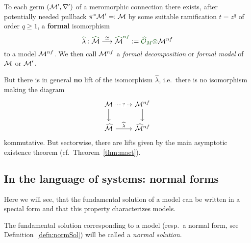 \begin{thm}\label{thm:leveltTurittin}
  To each germ $(\mathcal{M}',\nabla')$ of a meromorphic connection there exists, after
  potentially needed pullback $\pi^{*}\textcolor{black}{\mathcal{M}'}=:\mathcal{M}$ by some
  suitable ramification $t=z^q$ of order $q\geq1$, a
  \textcolor{green!30!black}{\textbf{formal}} isomorphism
  \[
    \textcolor{green!30!black}{\hat{\textcolor{black}{\lambda}}}:
    \textcolor{green!30!black}{\hat{\textcolor{black}{\cM}}}
    \overset{\cong}\longrightarrow
    \textcolor{green!30!black}{\hat{\textcolor{black}{\cM}}^{nf}}
    :=\textcolor{green!30!black}{\hat\cO_M\otimes}\cM^{nf}
  \]
  to a model $\mathcal{M}^{nf}$.
  We then call $\mathcal{M}^{nf}$ a \emph{formal decomposition} or \emph{formal model}
  of $\mathcal{M}$ or $\mathcal{M}'$.
  \begin{rem}
    But there is in general \textbf{no} lift of the isomorphism $\hat\lambda$,
    i.e.\ there is no isomorphism making the diagram
    \[ \begin{tikzcd}
        \cM \dar \arrow[dotted]{r}[description]{?} & \cM^{nf} \dar
        \\\hat\cM \rar{\hat\lambda} & \hat\cM^{nf}
    \end{tikzcd} \]
    kommutative.
    But sectorwise, there are lifts given by the main asymptotic existence
    theorem (cf.\ Theorem~\ref{thm:maet}).
  \end{rem}
\end{thm}
\begin{comment}
  \begin{proof}
    See \TODO{}
  \end{proof}
\end{comment}

\subsection{In the language of systems: normal forms}
Here we will see, that the fundamental solution of a model can be written in a
special form and that this property characterizes models.
\begin{defn}
  The fundamental solution corresponding to a model (resp.\ a normal form, see
  Definition~\ref{defn:normSol}) will be called a
  \emph{normal solution}.
\end{defn}

